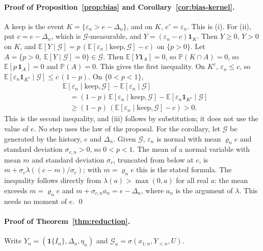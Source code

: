 \paragraph{Proof of Proposition~\ref{prop:bias} and Corollary~\ref{cor:bias-kernel}.}
A keep is the event $K=\{\varepsilon_n>e-\Delta_n\}$, and on $K$, $e'=\varepsilon_n$. This is (i). For (ii), put $c=e-\Delta_n$, which is $\mathcal{G}$-measurable, and $Y=(\varepsilon_n-c)\mathbf{1}_K$. Then $Y\ge0$, $Y>0$ on $K$, and $\mathbb{E}[Y\mid\mathcal{G}]=p\,(\mathbb{E}[\varepsilon_n\mid\mathrm{keep},\mathcal{G}]-c)$ on $\{p>0\}$. Let $A=\{p>0,\ \mathbb{E}[Y\mid\mathcal{G}]=0\}\in\mathcal{G}$. Then $\mathbb{E}[Y\mathbf{1}_A]=0$, so $\mathbb{P}(K\cap A)=0$, so $\mathbb{E}[p\,\mathbf{1}_A]=0$ and $\mathbb{P}(A)=0$. This gives the first inequality. On $K^c$, $\varepsilon_n\le c$, so $\mathbb{E}[\varepsilon_n\mathbf{1}_{K^c}\mid\mathcal{G}]\le c\,(1-p)$. On $\{0<p<1\}$,
\begin{align*}
&\mathbb{E}[\varepsilon_n\mid\mathrm{keep},\mathcal{G}]-\mathbb{E}[\varepsilon_n\mid\mathcal{G}]\\
&\quad=(1-p)\,\mathbb{E}[\varepsilon_n\mid\mathrm{keep},\mathcal{G}]-\mathbb{E}[\varepsilon_n\mathbf{1}_{K^c}\mid\mathcal{G}]\\
&\quad\ge(1-p)\,(\mathbb{E}[\varepsilon_n\mid\mathrm{keep},\mathcal{G}]-c)>0 .
\end{align*}
This is the second inequality, and (iii) follows by substitution; it does not use the value of $e$. No step uses the law of the proposal. For the corollary, let $\mathcal{G}$ be generated by the history, $e$ and $\Delta_n$. Given $\mathcal{G}$, $\varepsilon_n$ is normal with mean $\varrho_ne$ and standard deviation $\sigma_{c,n}>0$, so $0<p<1$. The mean of a normal variable with mean $m$ and standard deviation $\sigma_c$, truncated from below at $c$, is $m+\sigma_c\lambda((c-m)/\sigma_c)$; with $m=\varrho_ne$ this is the stated formula. The inequality follows directly from $\lambda(a)>\max(0,a)$ for all real $a$: the mean exceeds $m=\varrho_ne$ and $m+\sigma_{c,n}a_n=e-\Delta_n$, where $a_n$ is the argument of $\lambda$. This needs no moment of $e$. \qed

\paragraph{Proof of Theorem~\ref{thm:reduction}.}
Write $Y_n=(\mathbf{1}\{I_n\},\Delta_n,\eta_n)$ and $\mathcal{G}_n=\sigma(x_{1:n},Y_{<n},U)$.


